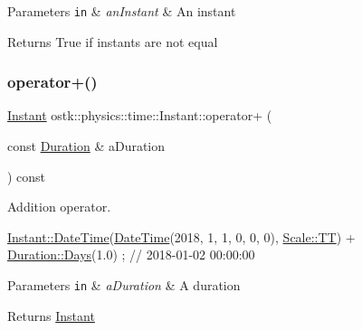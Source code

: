\begin{DoxyParams}[1]{Parameters}
\mbox{\tt in}  & {\em an\+Instant} & An instant \\
\hline
\end{DoxyParams}
\begin{DoxyReturn}{Returns}
True if instants are not equal 
\end{DoxyReturn}
\mbox{\label{classostk_1_1physics_1_1time_1_1_instant_ae3a88555e64eefbdf9953a5f96e8cb1b}} 
\subsubsection{\texorpdfstring{operator+()}{operator+()}}
{\footnotesize\ttfamily \hyperlink{classostk_1_1physics_1_1time_1_1_instant}{Instant} ostk\+::physics\+::time\+::\+Instant\+::operator+ (\begin{DoxyParamCaption}\item[{const \hyperlink{classostk_1_1physics_1_1time_1_1_duration}{Duration} \&}]{a\+Duration }\end{DoxyParamCaption}) const}



Addition operator. 


\begin{DoxyCode}
\hyperlink{classostk_1_1physics_1_1time_1_1_instant_afd5725574a02389b80fad4baff313c8a}{Instant::DateTime}(\hyperlink{classostk_1_1physics_1_1time_1_1_instant_afd5725574a02389b80fad4baff313c8a}{DateTime}(2018, 1, 1, 0, 0, 0), 
      \hyperlink{namespaceostk_1_1physics_1_1time_adf23d37bd8641fb76a0e98ab46a70df7adf1f3edb9115acb0a1e04209b7a9937b}{Scale::TT}) + \hyperlink{classostk_1_1physics_1_1time_1_1_duration_aefb4abc87c6957d00650228d069fa1e1}{Duration::Days}(1.0) ; \textcolor{comment}{// 2018-01-02 00:00:00}
\end{DoxyCode}



\begin{DoxyParams}[1]{Parameters}
\mbox{\tt in}  & {\em a\+Duration} & A duration \\
\hline
\end{DoxyParams}
\begin{DoxyReturn}{Returns}
\hyperlink{classostk_1_1physics_1_1time_1_1_instant}{Instant} 
\end{DoxyReturn}
\mbox{\label{classostk_1_1physics_1_1time_1_1_instant_a48ba0a7bd60a02b7c7f989adc9a451cb}} 

